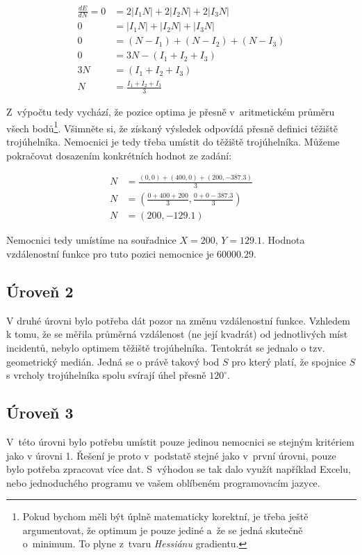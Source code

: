 \documentclass[12pt,a4paper]{article}
\begin{document}
\begin{align}
\frac{dE}{dN} = 0 &= 2|I_1 N| + 2|I_2N| + 2|I_3N| \nonumber \\
0 &= |I_1 N| + |I_2N| + |I_3N| \nonumber \\
0 &= (N-I_1) + (N-I_2) + (N-I_3) \nonumber \\
0 &= 3N - (I_1 + I_2 + I_3) \nonumber \\
3N &= (I_1 + I_2 + I_3) \nonumber \\
N &= \frac{I_1 + I_2 + I_3}{3} \nonumber
\end{align}

Z~výpočtu tedy vychází, že pozice optima je přesně v~aritmetickém průměru
všech bodů\footnote{Pokud bychom měli být úplně matematicky korektní, je třeba
ještě argumentovat, že optimum je pouze jediné a~že se jedná skutečně o~minimum.
To plyne z~tvaru \textit{Hessiánu} gradientu.}. Všimněte si, že získaný výsledek
odpovídá přesně definici těžiště trojúhelníka. Nemocnici je tedy třeba umístit
do těžiště trojúhelníka. Můžeme pokračovat dosazením konkrétních hodnot ze zadání:

\begin{align}
N &= \frac{(0, 0) + (400, 0) + (200, -387.3)}{3} \nonumber \\
N &= \left( \frac{0 + 400 + 200}{3}, \frac{0 + 0 - 387.3}{3} \right) \nonumber \\
N &= (200, -129.1)  \nonumber
\end{align}

Nemocnici tedy umístíme na souřadnice $X=200$, $Y=129.1$. Hodnota vzdálenostní
funkce pro tuto pozici nemocnice je $60000.29$.

\subsection*{Úroveň 2}
V druhé úrovni bylo potřeba dát pozor na změnu vzdálenostní funkce. Vzhledem k tomu, že se měřila průměrná vzdálenost (ne její kvadrát) od jednotlivých míst incidentů,
nebylo optimem těžiště trojúhelníka. Tentokrát se jednalo o tzv. geometrický medián. Jedná se o právě takový bod $S$ pro který platí, že spojnice $S$ s vrcholy trojúhelníka spolu svírají úhel přesně $120^\circ$.

\subsection*{Úroveň 3}
V~této úrovni bylo potřebu umístit pouze jedinou nemocnici se stejným kritériem
jako v úrovni 1. Řešení je proto v~podstatě stejné jako v~první úrovni, pouze
bylo potřeba zpracovat více dat. S~výhodou se tak dalo využít například Excelu,
nebo jednoduchého programu ve vašem oblíbeném programovacím jazyce.
\end{document}
